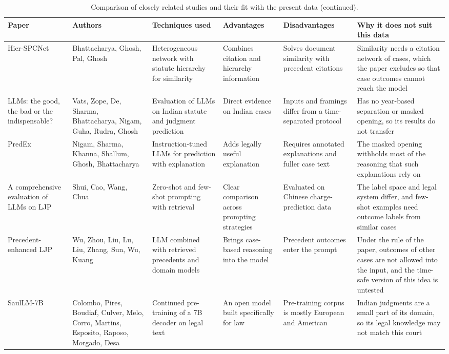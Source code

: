\documentclass[journal]{IEEEtran}
\begin{document}
\begin{table}[!t]
\addtocounter{table}{-1}
\caption{Comparison of closely related studies and their fit with the present data (continued).}
\scriptsize\setlength{\tabcolsep}{3pt}\renewcommand{\arraystretch}{1.1}
\centering
\begin{tabular}{@{}Y{0.145\textwidth}Y{0.095\textwidth}Y{0.165\textwidth}Y{0.155\textwidth}Y{0.155\textwidth}Y{0.21\textwidth}@{}}
\toprule
\textbf{Paper} & \textbf{Authors} & \textbf{Techniques used} & \textbf{Advantages} & \textbf{Disadvantages} & \textbf{Why it does not suit this data}\\\midrule
Hier-SPCNet \cite{r17} & Bhattacharya, Ghosh, Pal, Ghosh & Heterogeneous network with statute hierarchy for similarity & Combines citation and hierarchy information & Solves document similarity with precedent citations & Similarity needs a citation network of cases, which the paper excludes so that case outcomes cannot reach the model\\
LLMs: the good, the bad or the indispensable? \cite{r42} & Vats, Zope, De, Sharma, Bhattacharya, Nigam, Guha, Rudra, Ghosh & Evaluation of LLMs on Indian statute and judgment prediction & Direct evidence on Indian cases & Inputs and framings differ from a time-separated protocol & Has no year-based separation or masked opening, so its results do not transfer\\
PredEx \cite{r43} & Nigam, Sharma, Khanna, Shallum, Ghosh, Bhattacharya & Instruction-tuned LLMs for prediction with explanation & Adds legally useful explanation & Requires annotated explanations and fuller case text & The masked opening withholds most of the reasoning that such explanations rely on\\
A comprehensive evaluation of LLMs on LJP \cite{r49} & Shui, Cao, Wang, Chua & Zero-shot and few-shot prompting with retrieval & Clear comparison across prompting strategies & Evaluated on Chinese charge-prediction data & The label space and legal system differ, and few-shot examples need outcome labels from similar cases\\
Precedent-enhanced LJP \cite{r50} & Wu, Zhou, Liu, Lu, Liu, Zhang, Sun, Wu, Kuang & LLM combined with retrieved precedents and domain models & Brings case-based reasoning into the model & Precedent outcomes enter the prompt & Under the rule of the paper, outcomes of other cases are not allowed into the input, and the time-safe version of this idea is untested\\
SaulLM-7B \cite{r47} & Colombo, Pires, Boudiaf, Culver, Melo, Corro, Martins, Esposito, Raposo, Morgado, Desa & Continued pre-training of a 7B decoder on legal text & An open model built specifically for law & Pre-training corpus is mostly European and American & Indian judgments are a small part of its domain, so its legal knowledge may not match this court\\

\end{tabular}
\end{table}
\end{document}
